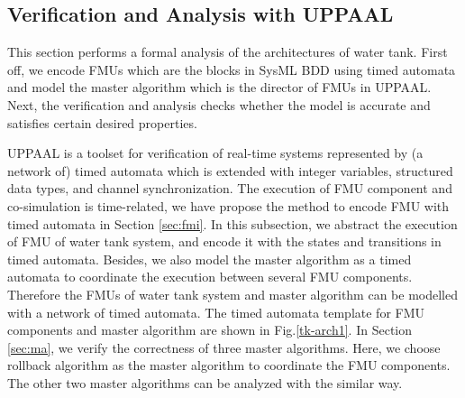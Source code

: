 \subsection{Verification and Analysis with UPPAAL}
\label{sec:mauppaal}
This section performs a formal analysis of the architectures of water tank. First off, we encode FMUs which are the blocks in SysML BDD using timed automata and model the master algorithm which is the director of FMUs in UPPAAL. Next, the verification and analysis checks whether the model is accurate and satisfies certain desired properties. 

UPPAAL \cite{BehrmannDLHPYH06} is a toolset for verification of real-time systems represented by (a network of) timed automata which is extended with integer variables, structured data types, and channel synchronization. The execution of FMU component and co-simulation is time-related, we have propose the method to encode FMU with timed automata in Section \ref{sec:fmi}. In this subsection, we abstract the execution of FMU of water tank system, and encode it with the states and transitions in timed automata. Besides, we also model the master algorithm as a timed automata to coordinate the execution between several FMU components. Therefore the FMUs of water tank system and master algorithm can be modelled with a network of timed automata. The timed automata template for FMU components and master algorithm are shown in Fig.\ref{tk-arch1}. In Section \ref{sec:ma}, we verify the correctness of three master algorithms. Here, we choose rollback algorithm as the master algorithm to coordinate the FMU components. The other two master algorithms can be analyzed with the similar way. 

